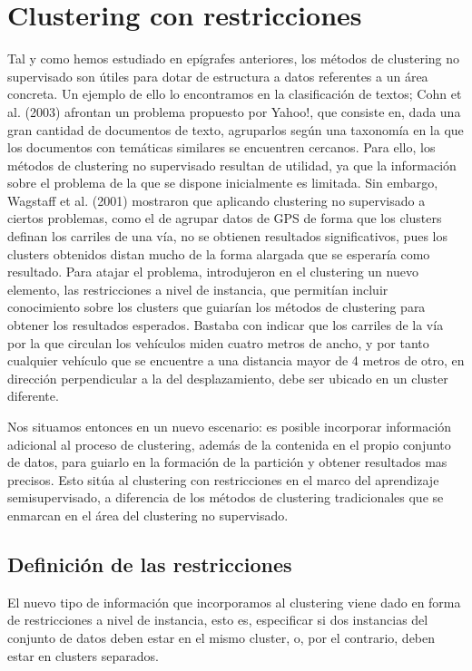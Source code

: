 \chapter{Clustering con restricciones}\label{ch:Clustering con restricciones}

Tal y como hemos estudiado en epígrafes anteriores, los métodos de clustering no supervisado son útiles para dotar de estructura a datos referentes a un área concreta. Un ejemplo de ello lo encontramos en la clasificación de textos; Cohn et al. (2003) afrontan un problema propuesto por Yahoo!, que consiste en, dada una gran cantidad de documentos de texto, agruparlos según una taxonomía en la que los documentos con temáticas similares se encuentren cercanos. Para ello, los métodos de clustering no supervisado resultan de utilidad, ya que la información sobre el problema de la que se dispone inicialmente es limitada. Sin embargo, Wagstaff et al. (2001) mostraron que aplicando clustering no supervisado a ciertos problemas, como el de agrupar datos de GPS de forma que los clusters definan los carriles de una vía, no se obtienen resultados significativos, pues los clusters obtenidos distan mucho de la forma alargada que se esperaría como resultado. Para atajar el problema, introdujeron en el clustering un nuevo elemento, las restricciones a nivel de instancia, que permitían incluir conocimiento sobre los clusters que guiarían los métodos de clustering para obtener los resultados esperados. Bastaba con indicar que los carriles de la vía por la que circulan los vehículos miden cuatro metros de ancho, y por tanto cualquier vehículo que se encuentre a una distancia mayor de 4 metros de otro, en dirección perpendicular a la del desplazamiento, debe ser ubicado en un cluster diferente.

Nos situamos entonces en un nuevo escenario: es posible incorporar información adicional al proceso de clustering, además de la contenida en el propio conjunto de datos, para guiarlo en la formación de la partición y obtener resultados mas precisos. Esto sitúa al clustering con restricciones en el marco del aprendizaje semisupervisado, a diferencia de los métodos de clustering tradicionales que se enmarcan en el área del clustering no supervisado. 

\section{Definición de las restricciones}

El nuevo tipo de  información que incorporamos al clustering viene dado en forma de restricciones a nivel de instancia, esto es, especificar si dos instancias del conjunto de datos deben estar en el mismo cluster, o, por el contrario, deben estar en clusters separados.

